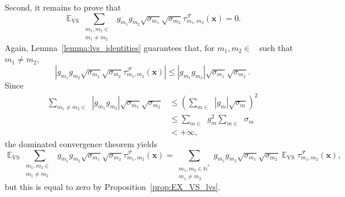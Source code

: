 \documentclass[twoside,11pt]{book}
\DeclareMathOperator{\VS}{\mathrm{VS}}
\DeclareMathOperator{\EX}{\mathbb{E}}
\DeclareMathOperator{\F}{\mathcal{F}}
\DeclareMathOperator{\Ns}{\mathbb{N}^{*}}
\begin{document}
Second, it remains to prove that
\begin{equation}\label{eq:interchange_EX_VS_cross_lvs}
\EX_{\VS} \sum\limits_{\substack{m_{1},m_{2} \in \Ns \\ m_{1} \neq m_{2}}}  g_{m_{1}}g_{m_{2}} \sqrt{\sigma_{m_{1}}} \sqrt{\sigma_{m_{2}}} \tau_{m_{1},m_{2}}^{\F}(\bm{x})
= 0.
\end{equation}
Again, Lemma~\ref{lemma:lvs_identities} guarantees that, for $m_{1},m_{2} \in \Ns$ such that $m_{1} \neq m_{2}$,
\begin{equation}
| g_{m_{1}}g_{m_{2}} \sqrt{\sigma_{m_{1}}} \sqrt{\sigma_{m_{2}}} \tau_{m_{1},m_{2}}^{\F}(\bm{x})| \leq | g_{m_{1}}g_{m_{2}} | \sqrt{\sigma_{m_{1}}} \sqrt{\sigma_{m_{2}}}.
\end{equation}
Since
\begin{align}
\sum\limits_{m_{1} \neq m_{2} \in \Ns} |g_{m_{1}}g_{m_{2}}| \sqrt{\sigma_{m_{1}}} \sqrt{\sigma_{m_{2}}}
& \leq  \left(\sum\limits_{m \in \Ns} |g_{m}| \sqrt{\sigma_{m}} \right)^{2} \nonumber \\
& \leq \sum\limits_{m \in \Ns}g_{m}^{2} \sum\limits_{m \in \Ns} \sigma_{m} \nonumber \\
& < + \infty,
\end{align}
the dominated convergence theorem yields 
$$
\EX_{\VS} \sum\limits_{\substack{m_{1},m_{2} \in \Ns \\ m_{1} \neq m_{2}}}  g_{m_{1}}g_{m_{2}} \sqrt{\sigma_{m_{1}}} \sqrt{\sigma_{m_{2}}} \tau_{m_{1},m_{2}}^{\F}(\bm{x})
= \sum\limits_{\substack{m_{1},m_{2} \in \mathbb{N}^{*} \\ m_{1} \neq m_{2}}}  g_{m_{1}}g_{m_{2}} \sqrt{\sigma_{m_{1}}} \sqrt{\sigma_{m_{2}}} \EX_{\VS} \tau_{m_{1},m_{2}}^{\F}(\bm{x}),
$$
but this is equal to zero by Proposition~\ref{prop:EX_VS_lvs}.
\end{document}
